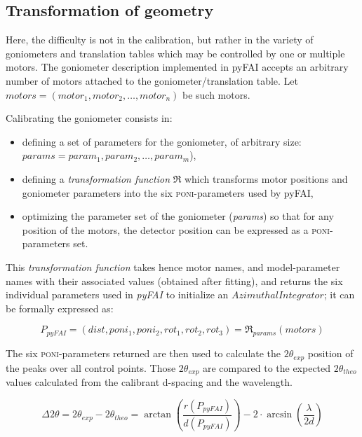 \documentclass[preprint]{iucr}              %
\begin{document}
\subsection{Transformation of geometry}

Here, the difficulty is not in the calibration, but rather in the
variety of goniometers and translation tables which may be controlled by one or 
multiple motors.
The goniometer description implemented in pyFAI accepts an
arbitrary number of motors attached to the goniometer/translation table. 
Let $motors = (motor_1, motor_2, \ldots, motor_n)$ be such motors. 

Calibrating the goniometer consists in:
\begin{itemize}
  \item defining a set of parameters for the goniometer, of arbitrary size:
  $params = param_1, param_2, \ldots, param_m$),
  \item defining a \textit{transformation function} $\Re$ which transforms motor positions
  and goniometer parameters into the six \textsc{poni}-parameters used by
  pyFAI,
  \item optimizing the parameter set of the goniometer (\textit{params}) so that
  for any position of the motors, the detector position can be expressed as
  a \textsc{poni}-parameters set.
\end{itemize}

This \textit{transformation function} takes hence motor names, and model-parameter names 
with their associated values (obtained after fitting), and returns
the six individual parameters used in \textit{pyFAI} to initialize an $AzimuthalIntegrator$; it can be formally
expressed as:

\begin{equation}
P_{pyFAI} = (dist, poni_1, poni_2, rot_1, rot_2, rot_3) = \Re_{params}(motors)
\end{equation}


The six \textsc{poni}-parameters returned 
are then used to
calculate the $2\theta_{exp}$ position of the peaks over all control
points.
Those $2\theta_{exp}$ are compared to
the expected $2\theta_{theo}$ values calculated from the calibrant d-spacing and
the wavelength.

$$
\Delta 2\theta = 2\theta _{exp} - 2\theta _{theo} =
\arctan(\frac{r(P_{pyFAI})}{d(P_{pyFAI})}) -  2 \cdot
\arcsin(\frac{\lambda}{2d})
$$
\end{document}
